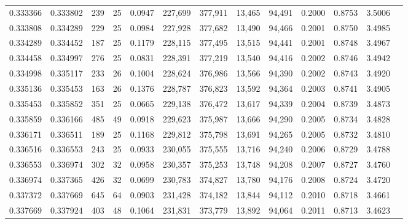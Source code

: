 \begin{tabular}{rrrrrrrrrrrrr}
0.333366 & 0.333802 &   239 &  25 &                                     0.0947 & 227,699 & 377,911 &  13,465 &  94,491 & 0.2000 & 0.8753 & 3.5006 \\
0.333808 & 0.334289 &   229 &  25 &                                     0.0984 & 227,928 & 377,682 &  13,490 &  94,466 & 0.2001 & 0.8750 & 3.4985 \\
0.334289 & 0.334452 &   187 &  25 &                                     0.1179 & 228,115 & 377,495 &  13,515 &  94,441 & 0.2001 & 0.8748 & 3.4967 \\
0.334458 & 0.334997 &   276 &  25 &                                     0.0831 & 228,391 & 377,219 &  13,540 &  94,416 & 0.2002 & 0.8746 & 3.4942 \\
0.334998 & 0.335117 &   233 &  26 &                                     0.1004 & 228,624 & 376,986 &  13,566 &  94,390 & 0.2002 & 0.8743 & 3.4920 \\
0.335136 & 0.335453 &   163 &  26 &                                     0.1376 & 228,787 & 376,823 &  13,592 &  94,364 & 0.2003 & 0.8741 & 3.4905 \\
0.335453 & 0.335852 &   351 &  25 &                                     0.0665 & 229,138 & 376,472 &  13,617 &  94,339 & 0.2004 & 0.8739 & 3.4873 \\
0.335859 & 0.336166 &   485 &  49 &                                     0.0918 & 229,623 & 375,987 &  13,666 &  94,290 & 0.2005 & 0.8734 & 3.4828 \\
0.336171 & 0.336511 &   189 &  25 &                                     0.1168 & 229,812 & 375,798 &  13,691 &  94,265 & 0.2005 & 0.8732 & 3.4810 \\
0.336516 & 0.336553 &   243 &  25 &                                     0.0933 & 230,055 & 375,555 &  13,716 &  94,240 & 0.2006 & 0.8729 & 3.4788 \\
0.336553 & 0.336974 &   302 &  32 &                                     0.0958 & 230,357 & 375,253 &  13,748 &  94,208 & 0.2007 & 0.8727 & 3.4760 \\
0.336974 & 0.337365 &   426 &  32 &                                     0.0699 & 230,783 & 374,827 &  13,780 &  94,176 & 0.2008 & 0.8724 & 3.4720 \\
0.337372 & 0.337669 &   645 &  64 &                                     0.0903 & 231,428 & 374,182 &  13,844 &  94,112 & 0.2010 & 0.8718 & 3.4661 \\
0.337669 & 0.337924 &   403 &  48 &                                     0.1064 & 231,831 & 373,779 &  13,892 &  94,064 & 0.2011 & 0.8713 & 3.4623 \\

\end{tabular}
